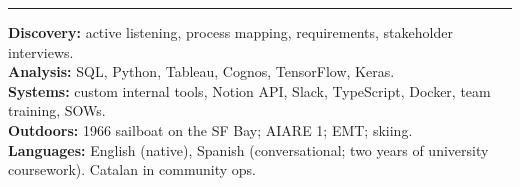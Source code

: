 \documentclass[10pt,letterpaper]{article}
\newcommand{\cvsection}[1]{%
  \vspace{7pt}%
  \noindent{\bfseries\fontsize{11pt}{13pt}\selectfont\MakeUppercase{#1}}\par
  \vspace{1pt}%
  \noindent\rule{\textwidth}{0.4pt}\par
  \vspace{4pt}%
}
\begin{document}
\cvsection{Skills}

\noindent\textbf{Discovery:} active listening, process mapping, requirements, stakeholder interviews.\\[2pt]
\noindent\textbf{Analysis:} SQL, Python, Tableau, Cognos, TensorFlow, Keras.\\[2pt]
\noindent\textbf{Systems:} custom internal tools, Notion API, Slack, TypeScript, Docker, team training, SOWs.\\[2pt]
\noindent\textbf{Outdoors:} 1966 sailboat on the SF Bay; AIARE 1; EMT; skiing.\\[2pt]
\noindent\textbf{Languages:} English (native), Spanish (conversational; two years of university coursework). Catalan in community ops.
\end{document}

